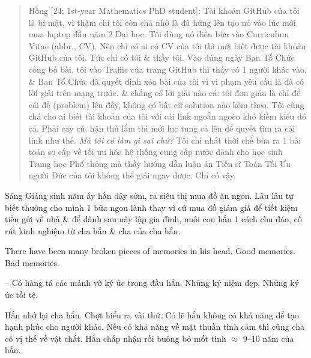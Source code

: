 \documentclass[12pt,twoside]{book}
\begin{document}
\begin{quote}
	{\sf Hồng [24; 1st-year Mathematics PhD student]}: Tài khoản {\sf GitHub} của tôi là bí mật, vì thậm chí tôi còn chả nhớ là đã hứng lên tạo nó vào lúc mới mua laptop đầu năm 2 Đại học. Tôi dùng nó điền bừa vào Curriculum Vitae (abbr., CV). Nên chỉ có ai có CV của tôi thì mới biết được tài khoản {\sf GitHub} của tôi. Tức chỉ có tôi \& thầy tôi. Vào đúng ngày Ban Tổ Chức công bố bài, tôi vào Traffic của trang {\sf GitHub} thì thấy có 1 người khác vào. \& Ban Tổ Chức đã quyết định xóa bài của tôi vì vi phạm yêu cầu là đã có lời giải trên mạng trước. \& chẳng có lời giải nào cả: tôi đơn giản là chỉ để cái đề (problem) lên đấy, không có bất cứ solution nào kèm theo. Tôi cũng chả cho ai biết tài khoản của tôi với cái link ngoằn ngoèo khó kiếm kiểu đó cả. Phải cay cú, hận thù lắm thì mới lục tung cả lên để quyết tìm ra cái link như thế. {\it Mà tôi có làm gì sai chứ?} Tôi chỉ nhất thời chế bừa ra 1 bài toán sơ cấp về tối ưu hóa hệ thống cung cấp nước dành cho học sinh Trung học Phổ thông mà thầy hướng dẫn luận án Tiến sĩ Toán Tối Ưu người Đức của tôi không thể giải ngay được. Chỉ có vậy.
\end{quote}
Sáng Giáng sinh năm ấy hắn dậy sớm, ra siêu thị mua đồ ăn ngon. Lâu lâu tự  biết thưởng cho mình 1 bữa ngon lành thay vì cứ mua đồ giảm giá để tiết kiệm tiền gửi về nhà \& để dành sau này lập gia đình, nuôi con hắn 1 cách chu đáo, cố rút kinh nghiệm từ cha hắn \& cha của cha hắn. 

There have been many broken pieces of memories in his head. Good memories. Bad memories.

-- Có hàng tá các mảnh vỡ ký ức trong đầu hắn. Những kỷ niệm đẹp. Những ký ức tồi tệ.

Hắn nhớ lại cha hắn. Chợt hiểu ra vài thứ. Có lẽ hắn không có khả năng để tạo hạnh phúc cho người khác. Nếu có khả năng về mặt thuần tình cảm thì cũng chả có vị thế về vật chất. Hắn chấp nhận rồi buông bỏ mốt tình $\approx$ 9--10 năm của hắn.
\end{document}
